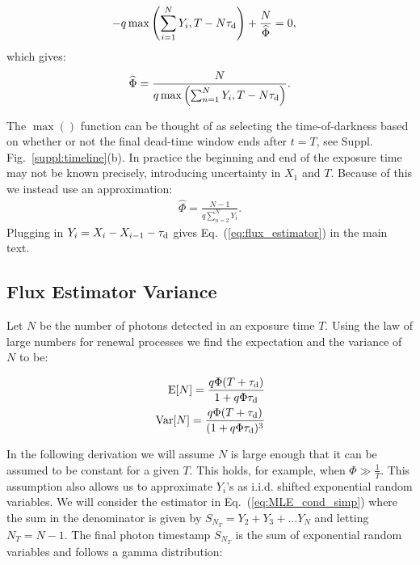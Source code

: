 \begin{align}
  - q\max\left(\sum_{i=1}^{N}Y_i,T-N\tau_\text{d}\right) + \frac{N}{\widehat\Phi} &= 0,
\end{align}
which gives: 
\begin{align}
  \widehat\Phi=\frac{N}{q\max\left(\sum_{n=1}^{N}Y_i,T-N\tau_\text{d}\right)}.\label{eq:MLE_cond}
\end{align}

The $\max()$ function can be thought of as selecting the time-of-darkness based
on whether or not the final dead-time window ends after $t=T$, see Suppl.
Fig.~\ref{suppl:timeline}(b). In practice the beginning and end of the exposure
time may not be known precisely, introducing uncertainty in $X_1$ and $T$.
Because of this we instead use an approximation:
\begin{align}
  \widehat\Phi=\frac{N-1}{q\sum_{n=2}^{N}Y_i}.\label{eq:MLE_cond_simp}
\end{align}
Plugging in $Y_i = X_i - X_{i-1} - \tau_\text{d}$ gives Eq.~(\ref{eq:flux_estimator})
in the main text.


\subsection*{Flux Estimator Variance}
Let $N$ be the number of photons detected in an exposure time $T$. Using the
law of large numbers for renewal processes we find the expectation and the
variance of $N$ to be:

\begin{align}
  \text{E}[N] = \frac{q\Phi(T+\tau_\text{d})}{1+q\Phi \tau_\text{d}} \\
  \text{Var}[N]=\frac{q\Phi(T+\tau_\text{d})}{(1+q\Phi \tau_\text{d})^3}
\end{align}

In the following derivation we will assume $N$ is large enough that it can be
assumed to be constant for a given $T$. This holds, for example, when $\Phi \gg
\frac{1}{T}$.  This assumption also allows us to approximate $Y_i$'s as i.i.d.
shifted exponential random variables. We will consider the estimator in
Eq.~(\ref{eq:MLE_cond_simp}) where the sum in the denominator is given by
$S_{N_T}=Y_2+Y_3+...Y_N$ and letting $N_T=N-1$.  The final photon timestamp
$S_{N_T}$ is the sum of exponential random variables and follows a gamma
distribution:


